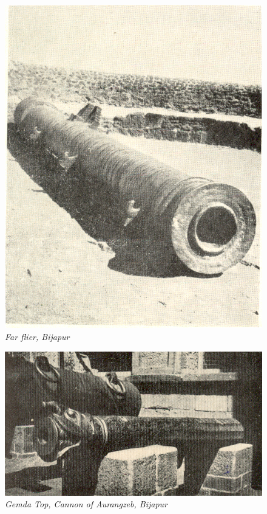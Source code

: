 \begin{figure}[H]
\includegraphics[scale=.7]{images/chapter-5/Fig33.jpg}
\caption{\textit{Far flier, Bijapur}}\label{chapter-5-fig33}
\end{figure}

\newpage

\begin{figure}[H]
\includegraphics[scale=.65]{images/chapter-5/Fig34.jpg}
\caption{\textit{Gemda Top, Cannon of Aurangzeb, Bijapur}}\label{chapter-5-fig34}
\end{figure}

